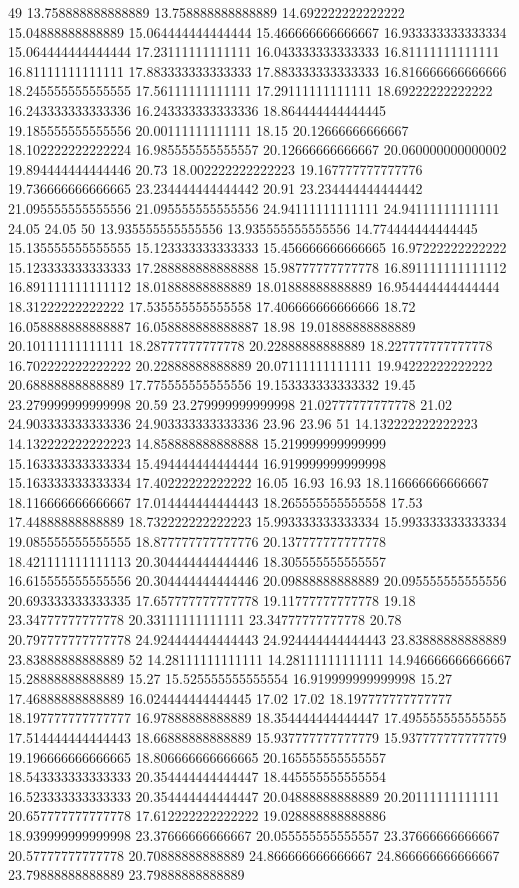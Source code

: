 49 13.758888888888889 13.758888888888889 14.692222222222222 15.04888888888889 15.064444444444444 15.466666666666667 16.933333333333334 15.064444444444444 17.23111111111111 16.043333333333333 16.81111111111111 16.81111111111111 17.883333333333333 17.883333333333333 16.816666666666666 18.245555555555555 17.56111111111111 17.29111111111111 18.69222222222222 16.243333333333336 16.243333333333336 18.864444444444445 19.185555555555556 20.00111111111111 18.15 20.12666666666667 18.102222222222224 16.985555555555557 20.12666666666667 20.060000000000002 19.894444444444446 20.73 18.002222222222223 19.167777777777776 19.736666666666665 23.234444444444442 20.91 23.234444444444442 21.095555555555556 21.095555555555556 24.94111111111111 24.94111111111111 24.05 24.05
50 13.935555555555556 13.935555555555556 14.774444444444445 15.135555555555555 15.123333333333333 15.456666666666665 16.97222222222222 15.123333333333333 17.288888888888888 15.98777777777778 16.891111111111112 16.891111111111112 18.01888888888889 18.01888888888889 16.954444444444444 18.31222222222222 17.535555555555558 17.406666666666666 18.72 16.058888888888887 16.058888888888887 18.98 19.01888888888889 20.10111111111111 18.28777777777778 20.22888888888889 18.227777777777778 16.702222222222222 20.22888888888889 20.07111111111111 19.94222222222222 20.68888888888889 17.775555555555556 19.153333333333332 19.45 23.279999999999998 20.59 23.279999999999998 21.02777777777778 21.02 24.903333333333336 24.903333333333336 23.96 23.96
51 14.132222222222223 14.132222222222223 14.858888888888888 15.219999999999999 15.163333333333334 15.494444444444444 16.919999999999998 15.163333333333334 17.40222222222222 16.05 16.93 16.93 18.116666666666667 18.116666666666667 17.014444444444443 18.265555555555558 17.53 17.44888888888889 18.732222222222223 15.993333333333334 15.993333333333334 19.085555555555555 18.877777777777776 20.137777777777778 18.421111111111113 20.304444444444446 18.305555555555557 16.615555555555556 20.304444444444446 20.09888888888889 20.095555555555556 20.693333333333335 17.657777777777778 19.11777777777778 19.18 23.34777777777778 20.33111111111111 23.34777777777778 20.78 20.797777777777778 24.924444444444443 24.924444444444443 23.83888888888889 23.83888888888889
52 14.28111111111111 14.28111111111111 14.946666666666667 15.28888888888889 15.27 15.525555555555554 16.919999999999998 15.27 17.46888888888889 16.024444444444445 17.02 17.02 18.197777777777777 18.197777777777777 16.97888888888889 18.354444444444447 17.495555555555555 17.514444444444443 18.66888888888889 15.937777777777779 15.937777777777779 19.196666666666665 18.806666666666665 20.165555555555557 18.543333333333333 20.354444444444447 18.445555555555554 16.523333333333333 20.354444444444447 20.04888888888889 20.20111111111111 20.657777777777778 17.612222222222222 19.028888888888886 18.939999999999998 23.37666666666667 20.055555555555557 23.37666666666667 20.57777777777778 20.70888888888889 24.866666666666667 24.866666666666667 23.79888888888889 23.79888888888889
